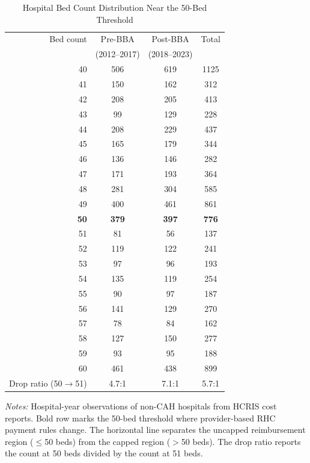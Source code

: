 \begin{table}[t]
\centering
\caption{Hospital Bed Count Distribution Near the 50-Bed Threshold}
\label{tab:distribution}
\begin{tabular}{rccc}
\hline\hline
Bed count & Pre-BBA & Post-BBA & Total \\
 & (2012--2017) & (2018--2023) & \\
\hline
40 & 506 & 619 & 1125 \\
41 & 150 & 162 & 312 \\
42 & 208 & 205 & 413 \\
43 & 99 & 129 & 228 \\
44 & 208 & 229 & 437 \\
45 & 165 & 179 & 344 \\
46 & 136 & 146 & 282 \\
47 & 171 & 193 & 364 \\
48 & 281 & 304 & 585 \\
49 & 400 & 461 & 861 \\
\textbf{50} & \textbf{379} & \textbf{397} & \textbf{776} \\
\hline
51 & 81 & 56 & 137 \\
52 & 119 & 122 & 241 \\
53 & 97 & 96 & 193 \\
54 & 135 & 119 & 254 \\
55 & 90 & 97 & 187 \\
56 & 141 & 129 & 270 \\
57 & 78 & 84 & 162 \\
58 & 127 & 150 & 277 \\
59 & 93 & 95 & 188 \\
60 & 461 & 438 & 899 \\
\hline
Drop ratio (50$\to$51) & 4.7:1 & 7.1:1 & 5.7:1 \\
\hline\hline
\end{tabular}
\begin{tablenotes}
\item \textit{Notes:} Hospital-year observations of non-CAH hospitals from HCRIS cost reports. Bold row marks the 50-bed threshold where provider-based RHC payment rules change. The horizontal line separates the uncapped reimbursement region ($\leq$50 beds) from the capped region ($>$50 beds). The drop ratio reports the count at 50 beds divided by the count at 51 beds.
\end{tablenotes}
\end{table}

